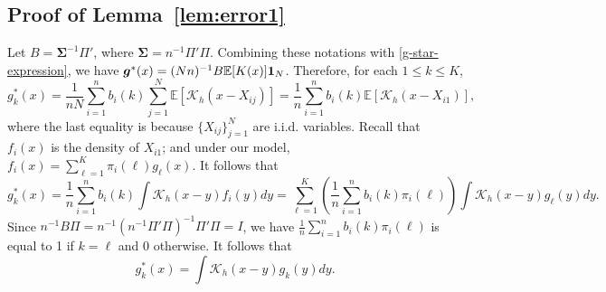 \documentclass[preprint,11pt]{article}
\newcommand{\mbb}{\mathbb}
\newcommand{\mcal}{\mathcal}
\newcommand{\bg}{{\boldsymbol g}}
\numberwithin{equation}{section}
\newcommand{\beq}{\begin{equation}}
\newcommand{\eeq}{\end{equation}}
\begin{document}
\subsection{Proof of Lemma~\ref{lem:error1}}
Let $B=\bm{\Sigma}^{-1} \Pi'$, where $\bm{\Sigma}=n^{-1}\Pi'\Pi$.
Combining these notations with 
\eqref{g-star-expression}, we have $\bg^*(x)=(Nn)^{-1}B\mathbb{E}[K(x)]{\bf 1}_N$. 
Therefore, for each $1\leq k\leq K$, 
\[
g^*_k(x)=\frac{1}{nN}\sum_{i=1}^n b_i(k)\sum_{j=1}^N\mbb{E}[\mcal{K}_h(x-X_{ij})]=\frac{1}{n}\sum_{i=1}^n b_i(k)\mbb{E}[\mcal{K}_h(x-X_{i1})],
\]
where the last equality is because $\{X_{ij}\}_{j=1}^N$ are i.i.d. variables. 
Recall that  $f_i(x)$ is the density of $X_{i1}$; and under our model, $f_i(x)=\sum_{\ell=1}^K \pi_i(\ell)g_\ell(x)$. It follows that 
\[
g^*_k(x) = \frac{1}{n}\sum_{i=1}^nb_i(k)\int \mcal{K}_h(x-y)f_i(y)dy
=\sum_{\ell=1}^K\left(\frac{1}{n}\sum_{i=1}^nb_i(k)\pi_i(\ell)\right)\int\mcal{K}_h(x-y)g_\ell(y)dy.
\]
Since $n^{-1}B\Pi=n^{-1}(n^{-1}\Pi'\Pi)^{-1}\Pi'\Pi=I$, we have $\frac{1}{n}\sum_{i=1}^nb_i(k)\pi_i(\ell)$ is equal to 1 if $k=\ell$ and 0 otherwise. 
It follows that 
\beq \label{proof-bias-1}
g_k^*(x)=\int \mcal{K}_h(x-y)g_k(y)dy. 
\eeq
\end{document}

